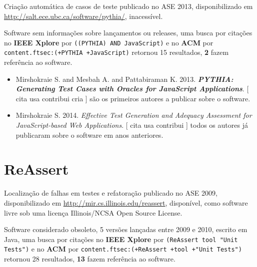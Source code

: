 Criação automática de casos de teste
publicado no ASE 2013,
disponibilizado em \url{http://salt.ece.ubc.ca/software/pythia/},
inacessível.

Software sem informações sobre lançamentos ou releases,
uma busca por citações no {\bf IEEE Xplore} por
\texttt{((PYTHIA) AND JavaScript)}
e no {\bf ACM} por
\texttt{content.ftsec:(+PYTHIA +JavaScript)}
retornou
15 resultados,
{\bf 2} fazem referência ao software.

\begin{itemize}
\item Mirshokraie S. and Mesbah A. and Pattabiraman K.
      2013.
        \textbf{\textit{ PYTHIA: Generating Test Cases with Oracles for JavaScript Applications}}.
      [
          cita
          usa
          contribui
          cria
      ]
são os primeiros autores a publicar sobre o software.
\item Mirshokraie S.
      2014.
        \textit{ Effective Test Generation and Adequacy Assessment for JavaScript-based Web Applications}.
      [
          cita
          usa
          contribui
      ]
todos os autores já publicaram sobre o software em anos anteriores.
\end{itemize}
\section{ReAssert}

Localização de falhas em testes e refatoração
publicado no ASE 2009,
disponibilizado em \url{http://mir.cs.illinois.edu/reassert},
disponível,
como software livre
sob uma licença Illinois/NCSA Open Source License.

Software considerado obsoleto,
5 versões lançadas
entre 2009 e 2010,
escrito em Java,
uma busca por citações no {\bf IEEE Xplore} por
\texttt{(ReAssert tool "Unit Tests")}
e no {\bf ACM} por
\texttt{content.ftsec:(+ReAssert +tool +"Unit Tests")}
retornou
28 resultados,
{\bf 13} fazem referência ao software.

